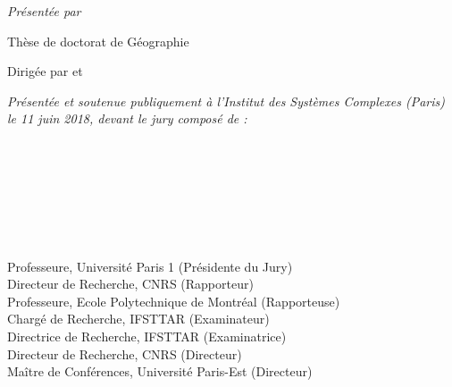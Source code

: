 \begin{titlepage}
\begin{addmargin}[-1cm]{-3cm}
\begin{center}

\textit{Présentée par} \spacedlowsmallcaps{\myName}\\ %
\bigskip

Thèse de doctorat de Géographie


Dirigée par \myProf et \myOtherProf \\ \medskip





\vspace{0.5cm}

\textit{Présentée et soutenue publiquement à l'Institut des Systèmes Complexes (Paris) le 11 juin 2018, devant le jury composé de :}

\bigskip


\begin{adjustwidth*}{-0.5cm}{-2cm}
\begin{minipage}{0.28\linewidth}
\raggedright
\textbf{}\\
\textbf{}\\
\textbf{}\\
\textbf{}\\
\textbf{}\\
\textbf{}\\
\textbf{}
\end{minipage}
\begin{minipage}{0.7\linewidth}
\raggedright
Professeure, Université Paris 1 (Présidente du Jury)\\
Directeur de Recherche, CNRS (Rapporteur)\\
Professeure, Ecole Polytechnique de Montréal (Rapporteuse)\\
Chargé de Recherche, IFSTTAR (Examinateur)\\
Directrice de Recherche, IFSTTAR (Examinatrice)\\
Directeur de Recherche, CNRS (Directeur)\\
Maître de Conférences, Université Paris-Est (Directeur)\\
\end{minipage}
\end{adjustwidth*}


\end{center}
\end{addmargin}
\end{titlepage}
